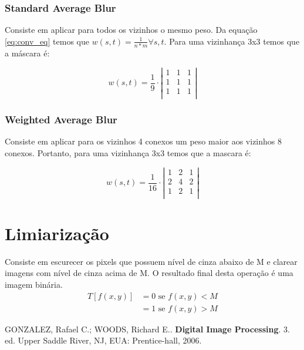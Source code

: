 \documentclass[10pt,a4paper]{article}
\begin{document}
\subsubsection*{Standard Average Blur}
Consiste em aplicar para todos os vizinhos o mesmo peso. Da equação \ref{eq:conv_eq} temos que $w(s,t) = \frac{1}{n * m} \forall s,t$. Para uma vizinhança 3x3 temos que a máscara é:

\[ w(s,t) = \frac{1}{9} \cdot \left|
\begin{array}{ccc}
1 & 1 & 1 \\
1 & 1 & 1 \\
1 & 1 & 1 \\
\end{array}\right|\]

\subsubsection*{Weighted Average Blur}
Consiste em aplicar para os vizinhos 4 conexos um peso maior aos vizinhos 8 conexos. Portanto, para uma vizinhança 3x3 temos que a mascara é:

\[ w(s,t) = \frac{1}{16} \cdot \left|
\begin{array}{ccc}
1 & 2 & 1 \\
2 & 4 & 2 \\
1 & 2 & 1 \\
\end{array}\right|\]

\section{Limiarização}
Consiste em escurecer os pixels que possuem nível de cinza abaixo de M e clarear imagens com nível de cinza acima de M. O resultado final desta operação é uma imagem binária.
\begin{align*}
    T[f(x,y)] &= 0 \text{ se } f(x,y) < M \\
              &= 1 \text{ se } f(x,y) > M
\end{align*}

\begin{thebibliography}{99}
     GONZALEZ, Rafael C.; WOODS, Richard E.. \textbf{Digital Image Processing}. 3. ed. Upper Saddle River, NJ, EUA: Prentice-hall, 2006.
\end{thebibliography}
\end{document}
